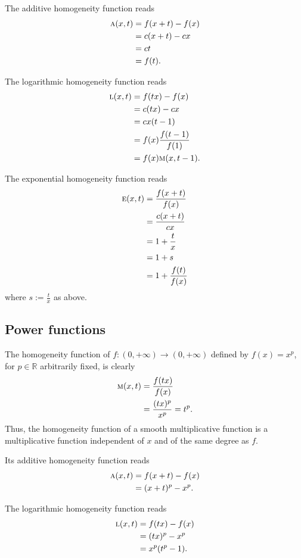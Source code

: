 \documentclass{amsart}
\makeatletter
\theoremstyle{plain}
\numberwithin{equation}{section}
\def\RIfM@{\relax\ifmmode}%
\def\RIfM@{\relax\protect\ifmmode}
\def\text{\RIfM@\expandafter\text@\else\expandafter\mbox\fi}
\def\text@#1{\mathchoice
   {\textdef@\displaystyle\f@size{#1}}%
   {\textdef@\textstyle\tf@size{\firstchoice@false #1}}%
   {\textdef@\textstyle\sf@size{\firstchoice@false #1}}%
   {\textdef@\textstyle \ssf@size{\firstchoice@false #1}}%
   \glb@settings}
\def\textdef@#1#2#3{\hbox{{%
                    \everymath{#1}%
                    \let\f@size#2\selectfont
                    #3}}}
\newif\iffirstchoice@
\newcommand{\eh}{\textsc{e}}
\newcommand{\R}{{\mathbb{R}}}
\makeatother
\begin{document}
The additive homogeneity function reads
\begin{align*}
\textsc{a}(x,t)&=f(x+t)-f(x)\\
&={c({x+t})}-{cx}\\
&=ct\\
&= f(t).
\end{align*}

The logarithmic homogeneity function reads
\begin{align*}
\textsc{l}(x,t)&=f(tx)-f(x)\\
&={c({tx})}-{cx}\\
&=cx (t-1)\\
&= f(x) \frac{f(t-1)}{f(1)}\\
&= f(x) \textsc{m} (x,t-1).
\end{align*}

The exponential homogeneity function reads
\begin{align*}
\eh(x,t)&=\frac{f(x+t)}{f(x)}\\
&=\frac{c(x+t)}{cx}\\
&=1 + \frac{t}{x}\\
&= 1 +s \\
&= 1 +\frac{f(t)}{f(x)}
\end{align*}
where $s:=\frac{t}{x}$ as above.

\subsection{Power functions}
The homogeneity function of $f:(0, +\infty) \to (0, +\infty)$ defined by $f(x)=x^p$, for $p\in \R$ arbitrarily fixed,
is clearly
\begin{align*}
\textsc{m}(x,t)&=\frac{f(tx)}{f(x)}\\
&=\frac{(tx)^p}{x^p}=t^p.
\end{align*}
Thus, the homogeneity function of a smooth multiplicative function is a multiplicative function independent of $x$
and of the same degree as $f$.


Its additive homogeneity function reads
\begin{align*}
\textsc{a}(x,t)&=f(x+t)-f(x)\\
&={(x+t)^p}-{x^p}.\\
\end{align*}

The logarithmic homogeneity function reads
\begin{align*}
\textsc{l}(x,t)&=f(tx)-f(x)\\
&={(tx)^p}-{x^p}\\
&=x^p (t^p -1).
\end{align*}
\end{document}

